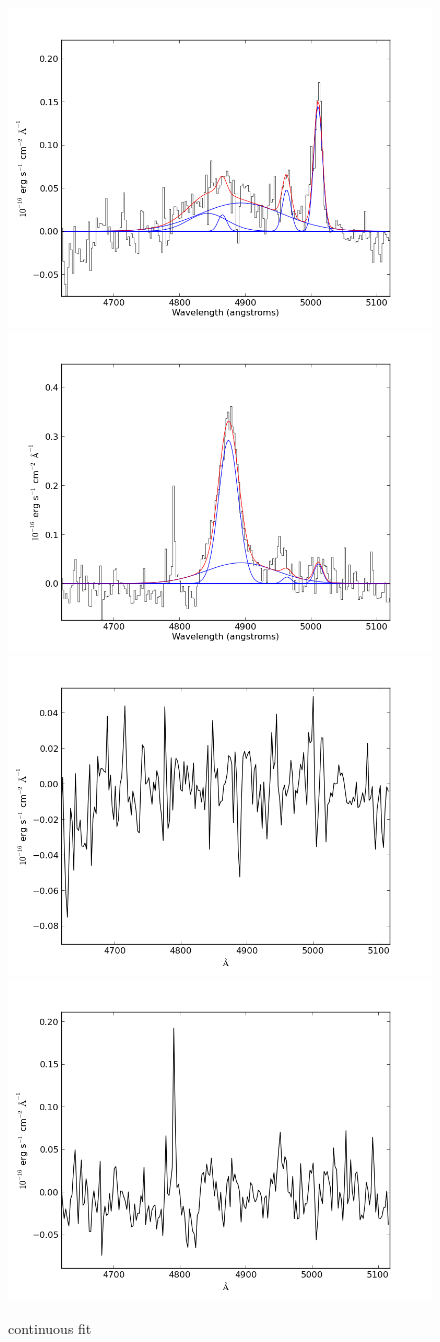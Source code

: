 \documentclass[usenatbib]{mn2e}
\begin{document}
\newpage

\begin{figure}
\begin{center}
\includegraphics[width=0.46\linewidth,angle=0]{Hbeta_8.png}
\vspace{5mm}
\includegraphics[width=0.49\linewidth,angle=0]{Hbeta_9.png}\\
\includegraphics[width=0.46\linewidth,angle=0]{Hbeta_res_8.png}
\hspace{5mm}
\includegraphics[width=0.49\linewidth,angle=0]{Hbeta_res_9.png}\\
\end{center} 
\caption{continuous fit \label{fig:landscape}}   
\end{figure}

\newpage
\end{document}
